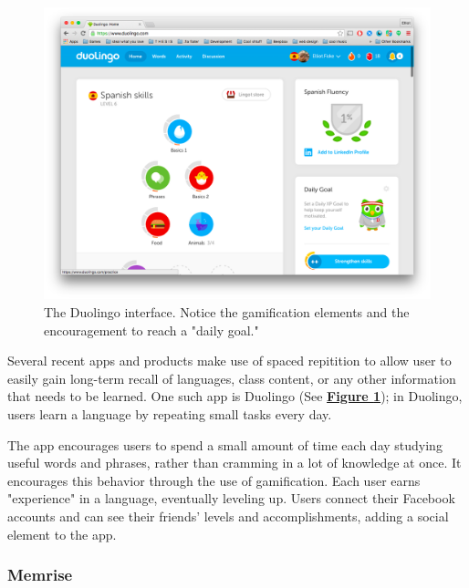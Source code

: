  
 
\begin{figure}
	\centering
	\includegraphics[width=1.0\linewidth]{duolingo}
	\caption[Duolingo]{The Duolingo interface. Notice the gamification elements and the encouragement to reach a "daily goal."}
	\label{fig:duolingo}
\end{figure}

\par Several recent apps and products make use of spaced repitition to allow user to easily gain long-term recall of languages, class content, or any other information that needs to be learned. One such app is Duolingo (See \textbf{\hyperref[fig:duolingo]{Figure \ref*{fig:duolingo}}}); in Duolingo, users learn a language by repeating small tasks every day. 

\par The app encourages users to spend a small amount of time each day studying useful words and phrases, rather than cramming in a lot of knowledge at once. It encourages this behavior through the use of gamification. Each user earns "experience" in a language, eventually leveling up. Users connect their Facebook accounts and can see their friends' levels and accomplishments, adding a social element to the app.

\subsubsection{Memrise}

